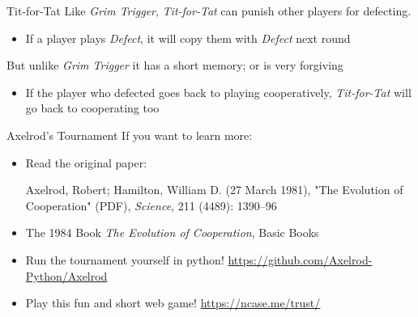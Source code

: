 \begin{frame}{Tit-for-Tat}
  Like \textit{Grim Trigger}, \textit{Tit-for-Tat} can punish other players for defecting. 
  \begin{itemize}
    \item If a player plays \textit{Defect}, it will copy them with \textit{Defect} next round 
  \end{itemize}
  But unlike \textit{Grim Trigger} it has a short memory; or is very forgiving
  \begin{itemize}
    \item If the player who defected goes back to playing cooperatively, 
    \textit{Tit-for-Tat} will go back to cooperating too
  \end{itemize}
\end{frame}

\begin{frame}{Axelrod's Tournament}
  If you want to learn more: 
  \begin{itemize}
    \item Read the original paper: 

    {
    \footnotesize
    Axelrod, Robert; Hamilton, William D. (27 March 1981), "The Evolution of Cooperation" (PDF), \textit{Science}, 211 (4489): 1390–96
    }

    \item The 1984 Book \textit{The Evolution of Cooperation}, Basic Books

    \item Run the tournament yourself in python!
    \url{https://github.com/Axelrod-Python/Axelrod}
    
    \item Play this fun and short web game! 
    \url{https://ncase.me/trust/}

  \end{itemize}
\end{frame}
